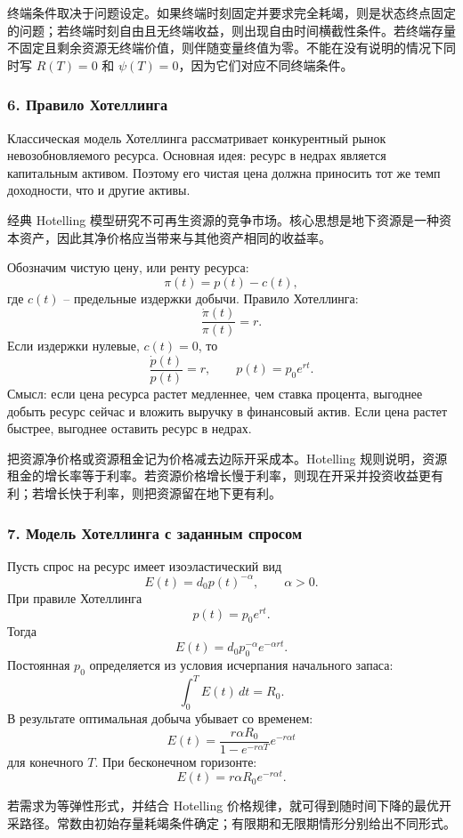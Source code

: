\documentclass[12pt,a4paper]{article}
\newcommand{\zh}[1]{\par\noindent #1\par}
\begin{document}
\zh{终端条件取决于问题设定。如果终端时刻固定并要求完全耗竭，则是状态终点固定的问题；若终端时刻自由且无终端收益，则出现自由时间横截性条件。若终端存量不固定且剩余资源无终端价值，则伴随变量终值为零。不能在没有说明的情况下同时写 $R(T)=0$ 和 $\psi(T)=0$，因为它们对应不同终端条件。}

\subsubsection*{6. Правило Хотеллинга}
Классическая модель Хотеллинга рассматривает конкурентный рынок невозобновляемого ресурса. Основная идея: ресурс в недрах является капитальным активом. Поэтому его чистая цена должна приносить тот же темп доходности, что и другие активы.

\zh{经典 Hotelling 模型研究不可再生资源的竞争市场。核心思想是地下资源是一种资本资产，因此其净价格应当带来与其他资产相同的收益率。}

Обозначим чистую цену, или ренту ресурса:
\[
\pi(t)=p(t)-c(t),
\]
где $c(t)$ -- предельные издержки добычи. Правило Хотеллинга:
\[
\frac{\dot\pi(t)}{\pi(t)}=r.
\]
Если издержки нулевые, $c(t)=0$, то
\[
\frac{\dot p(t)}{p(t)}=r,
\qquad
p(t)=p_0e^{rt}.
\]
Смысл: если цена ресурса растет медленнее, чем ставка процента, выгоднее добыть ресурс сейчас и вложить выручку в финансовый актив. Если цена растет быстрее, выгоднее оставить ресурс в недрах.

\zh{把资源净价格或资源租金记为价格减去边际开采成本。Hotelling 规则说明，资源租金的增长率等于利率。若资源价格增长慢于利率，则现在开采并投资收益更有利；若增长快于利率，则把资源留在地下更有利。}

\subsubsection*{7. Модель Хотеллинга с заданным спросом}
Пусть спрос на ресурс имеет изоэластический вид
\[
E(t)=d_0p(t)^{-\alpha},\qquad \alpha>0.
\]
При правиле Хотеллинга
\[
p(t)=p_0e^{rt}.
\]
Тогда
\[
E(t)=d_0p_0^{-\alpha}e^{-\alpha rt}.
\]
Постоянная $p_0$ определяется из условия исчерпания начального запаса:
\[
\int_0^T E(t)\,dt=R_0.
\]
В результате оптимальная добыча убывает со временем:
\[
E(t)=\frac{r\alpha R_0}{1-e^{-r\alpha T}}e^{-r\alpha t}
\]
для конечного $T$. При бесконечном горизонте:
\[
E(t)=r\alpha R_0e^{-r\alpha t}.
\]

\zh{若需求为等弹性形式，并结合 Hotelling 价格规律，就可得到随时间下降的最优开采路径。常数由初始存量耗竭条件确定；有限期和无限期情形分别给出不同形式。}
\end{document}

